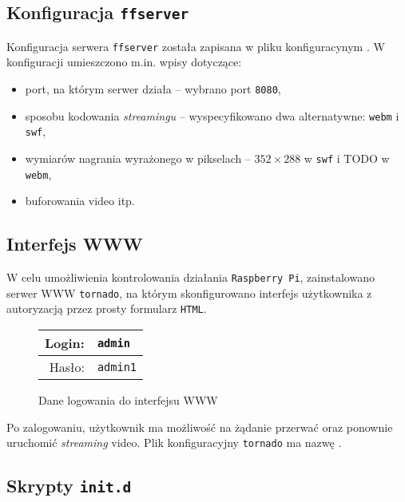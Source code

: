 \documentclass{article}
\begin{document}

\subsection{Konfiguracja \texttt{ffserver}}

Konfiguracja serwera \texttt{ffserver} została zapisana w pliku konfiguracynym . W konfiguracji umieszczono m.in. wpisy dotyczące:
\begin{itemize}
	\item port, na którym serwer działa -- wybrano port \texttt{8080},
	\item sposobu kodowania \emph{streamingu} -- wyspecyfikowano dwa alternatywne: \texttt{webm} i \texttt{swf},
	\item wymiarów nagrania wyrażonego w pikselach -- $352\times288$ w \texttt{swf} i TODO w \texttt{webm},
	\item buforowania video itp.
\end{itemize}


\subsection{Interfejs WWW}
\label{sec:www}

W celu umożliwienia kontrolowania działania \texttt{Raspberry~Pi}, zainstalowano serwer WWW \texttt{tornado}, na którym skonfigurowano interfejs użytkownika z autoryzacją przez prosty formularz \texttt{HTML}.
\begin{figure}[H]
\centering
\begin{tabular}{r|l}
Login: & \texttt{admin}\\
\hline
Hasło: & \texttt{admin1}\\
\end{tabular}
\caption{Dane logowania do interfejsu WWW}
\end{figure}
Po zalogowaniu, użytkownik ma możliwość na żądanie przerwać oraz ponownie uruchomić \emph{streaming} video. Plik konfiguracyjny \texttt{tornado} ma nazwę .


\subsection{Skrypty \texttt{init.d}}
\end{document}
